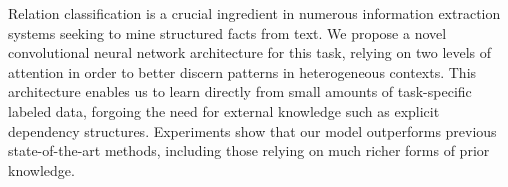 Relation classification is a crucial ingredient in numerous information extraction systems seeking to mine structured facts from text. We propose a novel convolutional neural network architecture for this task, relying on two levels of attention in order to better discern patterns in heterogeneous contexts. This architecture enables us to learn directly from small amounts of task-specific labeled data, forgoing the need for external knowledge such as explicit dependency structures. Experiments show that our model outperforms previous state-of-the-art methods, including those relying on much richer forms of prior knowledge.
